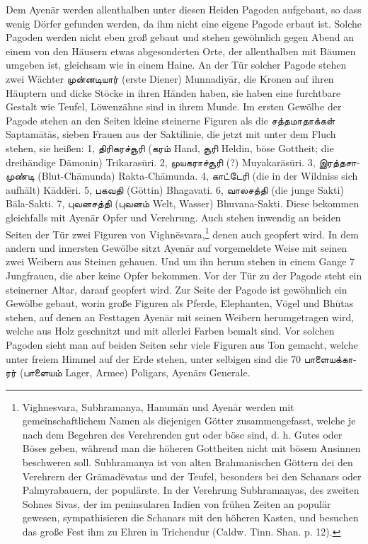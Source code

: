 \documentclass{article}
\newcommand{\TamilText}[1]{\texttamil{#1}}
\newcommand{\tam}[1]{\TamilText{#1}}
\begin{document}
Dem Ayen\={a}r werden allenthalben unter diesen Heiden Pagoden aufgebaut, so dass wenig Dörfer gefunden werden, da ihm nicht eine eigene Pagode erbaut ist. Solche Pagoden werden nicht eben groß gebaut und stehen gewöhnlich gegen Abend an einem von den Häusern etwas abgesonderten Orte, der allenthalben mit Bäumen umgeben ist, gleichsam wie in einem Haine. An der Tür solcher Pagode stehen zwei Wächter \tam{முன்னடியார்} (erste Diener) Munnadiy\={a}r, die Kronen auf ihren Häuptern und dicke Stöcke in ihren Händen haben, sie haben eine furchtbare Gestalt wie Teufel, Löwenzähne sind in ihrem Munde. Im ersten Gewölbe der Pagode stehen an den Seiten kleine steinerne Figuren als die \tam{சத்தமாதாக்கள்} Saptam\={a}t\={a}s, sieben Frauen aus der Saktilinie, die jetzt mit unter dem Fluch stehen, sie heißen: 1, \tam{திரிகரச்சூரி} (\tam{கரம்} Hand, \tam{சூரி} Heldin, böse Gottheit; die dreihändige Dämonin) Trikaras\={u}ri. 2, \tam{முயகராச்சூரி} (?) Muyakar\={a}s\={u}ri. 3, \tam{இரத்தசாமுண்டி} (Blut-Ch\={a}munda) Rakta-Ch\={a}munda. 4, \tam{காட்டேரி} (die in der Wildniss sich aufhält) K\={a}dd\={e}ri. 5, \tam{பகவதி} (Göttin) Bhagavati. 6, \tam{வாலசத்தி} (die junge Sakti) B\={a}la-Sakti. 7, \tam{புவனசத்தி} (\tam{புவனம்} Welt, Wasser) Bhuvana-Sakti. Diese bekommen gleichfalls mit Ayen\={a}r Opfer und Verehrung. Auch stehen inwendig an beiden Seiten der Tür zwei Figuren von Vighn\={e}svara,\footnote{Vighnesvara, Subhramanya, Hanum\={a}n und Ayen\={a}r werden mit gemeinschaftlichem Namen als diejenigen Götter zusammengefasst, welche je nach dem Begehren des Verehrenden gut oder böse sind, d. h. Gutes oder Böses geben, während man die höheren Gottheiten nicht mit bösem Ansinnen beschweren soll. Subhramanya ist von alten Brahmanischen Göttern dei den Verehrern der Gr\={a}mad\={e}vatas und der Teufel, besonders bei den Schanars oder Palmyrabauern, der populärste. In der Verehrung Subhramanyas, des zweiten Sohnes Sivas, der im peninsularen Indien von frühen Zeiten an populär gewesen, sympathisieren die Schanars mit den höheren Kasten, und besuchen das große Fest ihm zu Ehren in Trichendur (Caldw. Tinn. Shan. p. 12).} denen auch geopfert wird. In dem andern und innersten Gewölbe sitzt Ayen\={a}r auf vorgemeldete Weise mit seinen zwei Weibern aus Steinen gehauen. Und um ihn herum stehen in einem Gange 7 Jungfrauen, die aber keine Opfer bekommen. Vor der Tür zu der Pagode steht ein steinerner Altar, darauf geopfert wird. Zur Seite der Pagode ist gewöhnlich ein Gewölbe gebaut, worin große Figuren als Pferde, Elephanten, Vögel und Bh\={u}tas stehen, auf denen an Festtagen Ayen\={a}r mit seinen Weibern herumgetragen wird, welche aus Holz geschnitzt und mit allerlei Farben bemalt sind. Vor solchen Pagoden sieht man auf beiden Seiten sehr viele Figuren aus Ton gemacht, welche unter freiem Himmel auf der Erde stehen, unter selbigen sind die 70 \tam{பாளையக்காரர்} (\tam{பாளையம்} Lager, Armee) Poligars, Ayen\={a}rs Generale.
\end{document}
